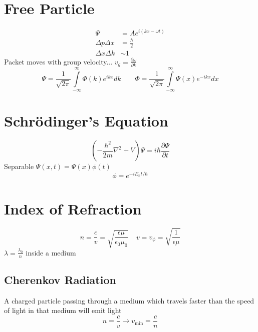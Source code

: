 \documentclass[10pt,letter]{article}
\begin{document}
\section{Free Particle} %
\label{sec:free_particle}
\begin{align}
    \Psi &= Ae^{i(kx-\omega t)}\\
    \Delta p \Delta x &= \frac{\hbar}{2}\\
    \Delta  x \Delta k &\sim 1
\end{align}
Packet moves with group velocity... $v_g = \frac{\partial \omega}{\partial k}$
\begin{equation}
    \Psi = \frac{1}{\sqrt{2\pi}} \int \limits_{-\infty}^\infty \Phi(k)e^{ikx}dk~~~~~~~~~\Phi = \frac{1}{\sqrt{2\pi}} \int \limits_{-\infty}^{\infty} \Psi(x)e^{-ikx}dx
\end{equation}

\section{Schr\"odinger's Equation} %
\label{sec:schrodinger}
\begin{equation}
    \left( -\frac{\hbar^2}{2m}\nabla^2 + V \right) \Psi = i \hbar \frac{\partial \Psi}{\partial t}
\end{equation}
Separable $\Psi (x,t) = \Psi(x) \phi(t)$
\begin{equation}
    \phi = e^{-iE_nt/\hbar}
\end{equation}

\section{Index of Refraction} %
\label{sec:index_of_refraction}
\begin{equation}
    n = \frac{c}{v} = \sqrt{\frac{\epsilon \mu}{\epsilon_0 \mu_0}}~~~~~ v=v_\phi=\sqrt{\frac{1}{\epsilon \mu}}
\end{equation}
$\lambda = \frac{\lambda_0}{n}$ inside a medium

\subsection{Cherenkov Radiation} %
\label{sub:cherenkov_radiation}
A charged particle passing through a medium which travels faster than the speed of light in that medium will emit light
\begin{equation}
    n = \frac{c}{v} \longrightarrow v_{\textrm{min}} = \frac{c}{n}
\end{equation}
\end{document}
